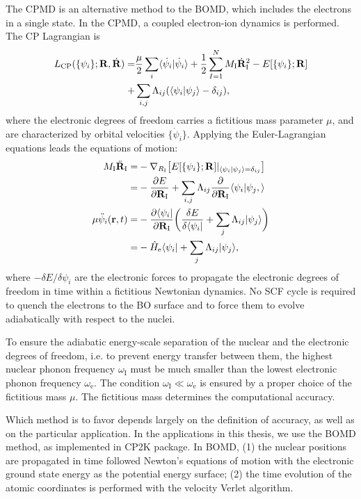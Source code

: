 The CPMD is an alternative method to the BOMD, which includes the 
electrons in a single state\cite{CP}. In the CPMD, a coupled electron-ion dynamics is performed.
The CP Lagrangian is 
\begin{align}
L_{\text{CP}} (\{\psi_i\}; {\bf R},\dot{{\bf R}}) =& \frac{\mu}{2}\sum_i\langle\dot{\psi}_i|\dot{\psi}_i\rangle +  \frac{1}{2}\sum^N_{I=1}M_{\text{I}}\dot{\bf R}^2_{\text{I}}  - E[\{\psi_i\};{\bf R}] \nonumber \\
   +& \sum_{i,j}\Lambda_{ij}(\langle\psi_i|\psi_j\rangle -\delta_{ij} ),
\label{eq:L_CP}
\end{align}
where the electronic degrees of freedom carries a fictitious mass parameter $\mu$, and are characterized by orbital velocities 
$\{\dot{\psi}_i\}$.  Applying the Euler-Lagrangian equations leads the equations of motion:
\begin{align}
  M_{\text{I}}\ddot{\bf R}_{\text{I}} =& -\nabla_{R_{\text{I}}} \bigl[E[\{\psi_i\};{\bf R}]|_{\langle\psi_i|\psi_j\rangle=\delta_{ij} }\bigr]\nonumber \\
  =&-\frac{\partial E}{\partial {\bf R}_{\text{I}}}  + \sum_{i,j}\Lambda_{ij}\frac{\partial}{\partial {\bf R}_{\text{I}}}\langle\psi_i|\psi_j, \rangle\\ 
  \mu\ddot{\psi}_i({\bf r},t) =& -\frac{\partial \langle\psi_i|}{\partial {\bf R}_{\text{I}}}\biggl(\frac{\delta E}{\delta\langle\psi_i|} + \sum_j \Lambda_{ij}|\psi_j\rangle\biggr)\nonumber \\
  =& -\hat{H}_{\text{e}}\langle\psi_i| + \sum_j \Lambda_{ij}|\psi_j\rangle,
\label{eq:LEE_CP}
\end{align}
where $-\delta E/\delta\psi_i$ are the electronic forces to propagate the electronic degrees of freedom in time 
within a fictitious Newtonian dynamics.  No SCF cycle is required to quench the electrons to the BO surface and 
to force them to evolve adiabatically with respect to the nuclei.

To ensure the adiabatic energy-scale separation of the nuclear and the electronic degrees of freedom, i.e. 
to prevent energy transfer between them, the highest nuclear phonon frequency  $\omega_{\text{I}}$ must be 
much smaller than the lowest electronic phonon frequency $\omega_{\text{e}}$. The condition $\omega_{\text{I}} \ll \omega_{\text{e}}$ 
is ensured by a proper choice of the fictitious mass $\mu$. The fictitious mass determines the computational accuracy.  

Which method is to favor depends largely on the definition of accuracy, as well as on the particular application.
In the applications in this thesis, we use the BOMD method, as implemented in CP2K package\cite{CP2K,Kuehne2020}. 
In BOMD,  
(1) the nuclear positions are propagated in time followed Newton's equations of motion with the electronic ground state energy as the potential energy surface; 
(2) the time evolution of the atomic coordinates is performed with the velocity Verlet algorithm\cite{FS2002}.

